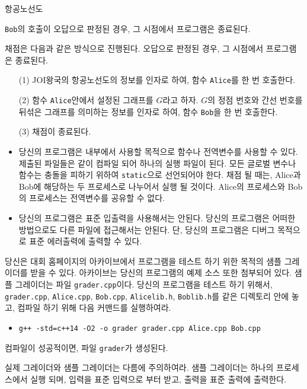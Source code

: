 \begin{problem}{항공노선도}
\begin{itemize}
	\texttt{Bob}의 호출이 오답으로 판정된 경우, 그 시점에서 프로그램은 종료된다.
	
\end{itemize}


채점은 다음과 같은 방식으로 진행된다. 오답으로 판정된 경우, 그 시점에서 프로그램은 종료된다.

\begin{enumerate}
	\item[(1)] JOI왕국의 항공노선도의 정보를 인자로 하여, 함수 \texttt{Alice}를 한 번 호출한다.
	\item[(2)] 함수 \texttt{Alice}안에서 설정된 그래프를 $G$라고 하자. $G$의 정점 번호와 간선 번호를 뒤섞은 그래프를 의미하는 정보를 인자로 하여, 함수 \texttt{Bob}을 한 번 호출한다.
	\item[(3)] 채점이 종료된다.
\end{enumerate}


\Notes

\begin{itemize}
	\item 당신의 프로그램은 내부에서 사용할 목적으로 함수나 전역변수를 사용할 수 있다. 제출된 파일들은 같이 컴파일 되어 하나의 실행 파일이 된다. 모든 글로벌 변수나 함수는 충돌을 피하기 위하여 \texttt{static}으로 선언되어야 한다. 채점 될 때는, Alice과 Bob에 해당하는 두 프로세스로 나누어서 실행 될 것이다. Alice의 프로세스와 Bob의 프로세스는 전역변수를 공유할 수 없다.
	\item 당신의 프로그램은 표준 입출력을 사용해서는 안된다. 당신의 프로그램은 어떠한 방법으로도 다른 파일에 접근해서는 안된다. 단, 당신의 프로그램은 디버그 목적으로 표준 에러출력에 출력할 수 있다.
\end{itemize}

당신은 대회 홈페이지의 아카이브에서 프로그램을 테스트 하기 위한 목적의 샘플 그레이더를 받을 수 있다. 아카이브는 당신의 프로그램의 예제 소스 또한 첨부되어 있다.
샘플 그레이더는 파일 \texttt{grader.cpp}이다. 당신의 프로그램을 테스트 하기 위해서, \texttt{grader.cpp}, \texttt{Alice.cpp}, \texttt{Bob.cpp}, \texttt{Alicelib.h}, \texttt{Boblib.h}를 같은 디렉토리 안에 놓고, 컴파일 하기 위해 다음 커맨드를 실행하여라.

\begin{itemize}
	\item \texttt{g++ -std=c++14 -O2 -o grader grader.cpp Alice.cpp Bob.cpp}
\end{itemize}

컴파일이 성공적이면, 파일 \texttt{grader}가 생성된다.

실제 그레이더와 샘플 그레이더는 다름에 주의하여라. 샘플 그레이더는 하나의 프로세스에서 실행 되며, 입력을 표준 입력으로 부터 받고, 출력을 표준 출력에 출력한다.


\end{problem}
